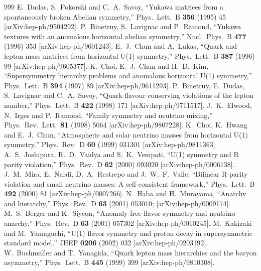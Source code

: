 \begin{thebibliography}{999}
  E.~Dudas, S.~Pokorski and C.~A.~Savoy,
  ``Yukawa matrices from a spontaneously broken Abelian symmetry,''
  Phys.\ Lett.\ B {\bf 356} (1995) 45
  [arXiv:hep-ph/9504292].
 P.~Binetruy, S.~Lavignac and P.~Ramond,
  ``Yukawa textures with an anomalous horizontal abelian symmetry,''
  Nucl.\ Phys.\ B {\bf 477} (1996) 353
  [arXiv:hep-ph/9601243].
 E.~J.~Chun and A.~Lukas,
  ``Quark and lepton mass matrices from horizontal U(1) symmetry,''
  Phys.\ Lett.\ B {\bf 387} (1996) 99
  [arXiv:hep-ph/9605377].
  K.~Choi, E.~J.~Chun and H.~D.~Kim,
  ``Supersymmetry hierarchy problems and anomalous horizontal U(1)  symmetry,''
  Phys.\ Lett.\ B {\bf 394} (1997) 89
  [arXiv:hep-ph/9611293].
 P.~Binetruy, E.~Dudas, S.~Lavignac and C.~A.~Savoy,
  ``Quark flavour conserving violations of the lepton number,''
  Phys.\ Lett.\ B {\bf 422} (1998) 171
  [arXiv:hep-ph/9711517].
  J.~K.~Elwood, N.~Irges and P.~Ramond,
  ``Family symmetry and neutrino mixing,''
  Phys.\ Rev.\ Lett.\  {\bf 81} (1998) 5064
  [arXiv:hep-ph/9807228].
 K.~Choi, K.~Hwang and E.~J.~Chun,
  ``Atmospheric and solar neutrino masses from horizontal U(1) symmetry,''
  Phys.\ Rev.\ D {\bf 60} (1999) 031301
  [arXiv:hep-ph/9811363].
  A.~S.~Joshipura, R.~D.~Vaidya and S.~K.~Vempati,
  ``U(1) symmetry and R parity violation,''
  Phys.\ Rev.\ D {\bf 62} (2000) 093020
  [arXiv:hep-ph/0006138].
 J.~M.~Mira, E.~Nardi, D.~A.~Restrepo and J.~W.~F.~Valle,
  ``Bilinear R-parity violation and small neutrino masses:  A self-consistent
  framework,''
  Phys.\ Lett.\ B {\bf 492} (2000) 81
  [arXiv:hep-ph/0007266].
 N.~Haba and H.~Murayama,
  ``Anarchy and hierarchy,''
  Phys.\ Rev.\ D {\bf 63} (2001) 053010;
  [arXiv:hep-ph/0009174].
 M.~S.~Berger and K.~Siyeon,
  ``Anomaly-free flavor symmetry and neutrino anarchy,''
  Phys.\ Rev.\ D {\bf 63} (2001) 057302
  [arXiv:hep-ph/0010245].
 M.~Kakizaki and M.~Yamaguchi,
  ``U(1) flavor symmetry and proton decay in supersymmetric standard model,''
  JHEP {\bf 0206} (2002) 032
  [arXiv:hep-ph/0203192].
 W.~Buchmuller and T.~Yanagida,
  ``Quark lepton mass hierarchies and the baryon asymmetry,''
  Phys.\ Lett.\ B {\bf 445} (1999) 399
  [arXiv:hep-ph/9810308].

\end{thebibliography}
